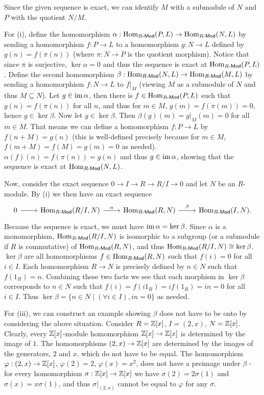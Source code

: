 \begin{solution}
	Since the given sequence is exact, we can identify $M$ with a submodule of $N$ and $P$ with the quotient $N/M$.
	
	For (i), define the homomorphism $\alpha: \mathrm{Hom}_{R\text{-}\mathsf{Mod}}(P, L) \to \mathrm{Hom}_{R\text{-}\mathsf{Mod}}(N, L)$ by sending a homomorphism $f: P \to L$ to a homomorphism $g: N \to L$ defined by $g(n) = f(\pi(n))$ (where $\pi: N \to P$ is the quotient morphism). Notice that since $\pi$ is surjective, $\ker \alpha = 0$ and thus the sequence is exact at $\mathrm{Hom}_{R\text{-}\mathsf{Mod}}(P, L)$. Define the second homomorphism $\beta: \mathrm{Hom}_{R\text{-}\mathsf{Mod}}(N, L) \to \mathrm{Hom}_{R\text{-}\mathsf{Mod}}(M, L)$ by sending a homomorphism $f: N \to L$ to $f|_M$ (viewing $M$ as a submodule of $N$ and thus $M \subseteq N$). Let $g \in \operatorname{im} \alpha$, then there is $f \in \mathrm{Hom}_{R\text{-}\mathsf{Mod}}(P, L)$ such that $g(n) = f(\pi(n))$ for all $n$, and thus for $m \in M$, $g(m) = f(\pi(m)) = 0$, hence $g \in \ker \beta$. Now let $g \in \ker \beta$. Then $\beta(g)(m) = g|_M(m) = 0$ for all $m \in M$. That means we can define a homomorphism $f: P \to L$ by $f(n + M) = g(n)$ (this is well-defined precisely because for $m \in M$, $f(m + M) = f(M) = g(m) = 0$ as needed). $\alpha(f)(n) = f(\pi(n)) = g(n)$ and thus $g \in \operatorname{im} \alpha$, showing that the sequence is exact at $\mathrm{Hom}_{R\text{-}\mathsf{Mod}}(N, L)$.
	
	Now, consider the exact sequence $0 \to I \to R \to R/I \to 0$ and let $N$ be an $R$-module. By (i) we then have an exact sequence
	\[
		\begin{tikzcd}
			0
			\arrow[r]
			& \Hom_{\CRmod}(R/I, N)
			\arrow[r, "\alpha"]
			& \Hom_{\CRmod}(R, N)
			\arrow[r, "\beta"]
			& \Hom_{\CRmod}(I, N) \text{.}
		\end{tikzcd}
	\]
	Because the sequence is exact, we must have $\operatorname{im} \alpha = \ker \beta$. Since $\alpha$ is a monomorphism, $\mathrm{Hom}_{R\text{-}\mathsf{Mod}}(R/I, N)$ is isomorphic to a subgroup (or a submodule if $R$ is commutative) of $\mathrm{Hom}_{R\text{-}\mathsf{Mod}}(R, N)$, and thus $\mathrm{Hom}_{R\text{-}\mathsf{Mod}}(R/I, N) \cong \ker \beta$. $\ker \beta$ are all homomorphisms $f \in \mathrm{Hom}_{R\text{-}\mathsf{Mod}}(R, N)$ such that $f(i) = 0$ for all $i \in I$. Each homomorphism $R \to N$ is precisely defined by $n \in N$ such that $f(1_R) = n$. Combining these two facts we see that each morphism in $\ker \beta$ corresponds to $n \in N$ such that $f(i) = f(i 1_R) = i f(1_R) = i n = 0$ for all $i \in I$. Thus $\ker \beta = \{ n \in N \mid (\forall i \in I), in = 0 \}$ as needed.
	
	For (iii), we can construct an example showing $\beta$ does not have to be onto by considering the above situation. Consider $R = \mathbb{Z}[x]$, $I = (2, x)$, $N = \mathbb{Z}[x]$. Clearly, every $\mathbb{Z}[x]$-module homomorphism $\mathbb{Z}[x] \to \mathbb{Z}[x]$ is determined by the image of $1$. The homomorphisms $(2, x) \to \mathbb{Z}[x]$ are determined by the images of the generators, $2$ and $x$, which do not have to be equal. The homomorphism $\varphi: (2, x) \to \mathbb{Z}[x]$, $\varphi(2) = 2$, $\varphi(x) = x^2$, does not have a preimage under $\beta$ - for every homomorphism $\sigma: \mathbb{Z}[x] \to \mathbb{Z}[x]$ we have $\sigma(2) = 2\sigma(1)$ and $\sigma(x) = x\sigma(1)$, and thus $\sigma|_{(2,x)}$ cannot be equal to $\varphi$ for any $\sigma$.
	

\end{solution}

